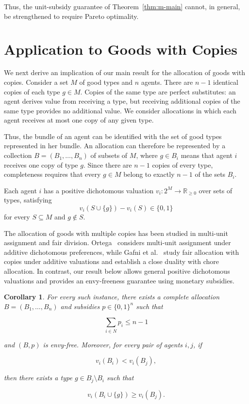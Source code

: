 \documentclass[sigconf,anonymous]{aamas}
\theoremstyle{acmplain}
\newtheorem{corollary}[theorem]{Corollary}
\theoremstyle{acmdefinition}
\theoremstyle{acmplain}
\begin{document}
Thus, the unit-subsidy guarantee of Theorem~\ref{thm:m-main} cannot, in general, be strengthened to require Pareto optimality.


\section{Application to Goods with Copies}\label{sec:app}

We next derive an implication of our main result for the allocation of goods with copies. Consider a set $M$ of good types and $n$ agents. There are $n-1$ identical copies of each type $g\in M$. Copies of the same type are perfect substitutes: an agent derives value from receiving a type, but receiving additional copies of the same type provides no additional value. We consider allocations in which each agent receives at most one copy of any given type.

Thus, the bundle of an agent can be identified with the set of good types represented in her bundle. An allocation can therefore be represented by a collection $B=(B_1,\ldots,B_n)$ of subsets of $M$, where $g\in B_i$ means that agent $i$ receives one copy of type $g$. Since there are $n-1$ copies of every type, completeness requires that every $g\in M$ belong to exactly $n-1$ of the sets $B_i$.

Each agent $i$ has a positive dichotomous valuation $v_i:2^M\to\mathbb{R}_{\geq 0}$ over sets of types, satisfying
$$
v_i(S\cup\{g\})-v_i(S)\in\{0,1\}
$$ for every $S\subseteq M$ and $g\notin S$.

The allocation of goods with multiple copies has been studied in multi-unit assignment and fair division. Ortega~\cite{ortega2020multi} considers multi-unit assignment under additive dichotomous preferences, while Gafni et al.~\cite{gafni2023unified} study fair allocation with copies under additive valuations and establish a close duality with chore allocation. In contrast, our result below allows general positive dichotomous valuations and provides an envy-freeness guarantee using monetary subsidies.

\begin{corollary}
For every such instance, there exists a complete allocation $B=(B_1,\ldots,B_n)$ and subsidies $p\in \{0,1\}^n$ such that

$$
\sum_{i\in N}p_i\leq n-1
$$

and $(B,p)$ is envy-free. Moreover, for every pair of agents $i,j$, if

$$
v_i(B_i)<v_i(B_j),
$$

then there exists a type $g\in B_j\setminus B_i$ such that

$$
v_i(B_i\cup\{g\})\geq v_i(B_j).
$$

\end{corollary}
\end{document}
